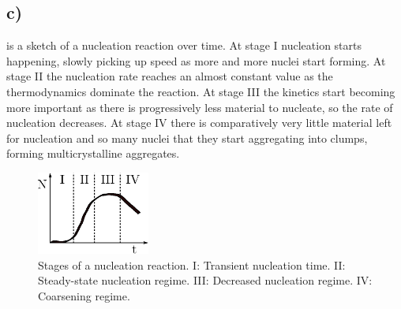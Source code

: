 \documentclass[a4paper]{article}
\begin{document}
	\subsection{c)}
	 is a sketch of a nucleation reaction over time. At stage I nucleation starts happening, slowly picking up speed as more and more nuclei start forming. At stage II the nucleation rate reaches an almost constant value as the thermodynamics dominate the reaction. At stage III the kinetics start becoming more important as there is progressively less material to nucleate, so the rate of nucleation decreases. At stage IV there is comparatively very little material left for nucleation and so many nuclei that they start aggregating into clumps, forming multicrystalline aggregates.
	\begin{figure}
		\centering
		\includegraphics[width=0.33\textwidth]{nuc.eps}
		\caption{Stages of a nucleation reaction. I: Transient nucleation time. II: Steady-state nucleation regime. III: Decreased nucleation regime. IV: Coarsening regime.}
		\label{f:nuc}
	\end{figure}
\end{document}
